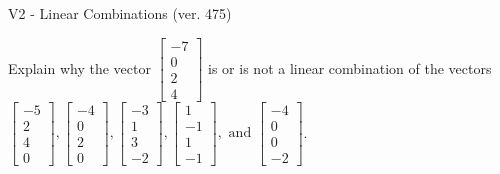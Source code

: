 \begin{exercise}
  \begin{exerciseTitle}V2 - Linear Combinations (ver. 475)\end{exerciseTitle}
  \begin{exerciseStatement}
    Explain why the vector \(\left[\begin{array}{c}
-7 \\
0 \\
2 \\
4
\end{array}\right]\)  is or is not a linear 
	combination of the vectors \(\left[\begin{array}{c}
-5 \\
2 \\
4 \\
0
\end{array}\right] , \left[\begin{array}{c}
-4 \\
0 \\
2 \\
0
\end{array}\right] , \left[\begin{array}{c}
-3 \\
1 \\
3 \\
-2
\end{array}\right] , \left[\begin{array}{c}
1 \\
-1 \\
1 \\
-1
\end{array}\right] , \text{ and } \left[\begin{array}{c}
-4 \\
0 \\
0 \\
-2
\end{array}\right]\).
	



\end{exerciseStatement}
\end{exercise}
